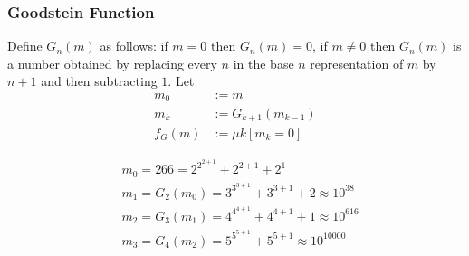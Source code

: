 \documentclass[UTF8,aspectratio=43,11pt,colorlinks,compress,openany]{beamer}%
\begin{document}
\begin{frame}\frametitle{Goodstein Function}
\setlength\abovedisplayskip{0pt}
\setlength\belowdisplayskip{0pt}
	\begin{definition}
		Define $G_n(m)$ as follows: if $m=0$ then $G_n(m)=0$, if $m\neq 0$ then $G_n(m)$ is a number obtained by replacing every $n$ in the base $n$ representation of $m$ by $n + 1$ and then subtracting $1$. Let
		\begin{align*}
		m_0&:=m\\
		m_k&:=G_{k+1}(m_{k-1})\\
		f_G(m)&:=\mu k[m_k=0]
		\end{align*}
	\end{definition}
	\begin{align*}
	&m_0=266=2^{2^{2+1}}+2^{2+1}+2^1\\
	&m_1=G_2(m_0)=3^{3^{3+1}}+3^{3+1}+2\approx 10^{38}\\
	&m_2=G_3(m_1)=4^{4^{4+1}}+4^{4+1}+1\approx 10^{616}\\
	&m_3=G_4(m_2)=5^{5^{5+1}}+5^{5+1}\approx 10^{10000}
	\end{align*}
\end{frame}
\end{document}
